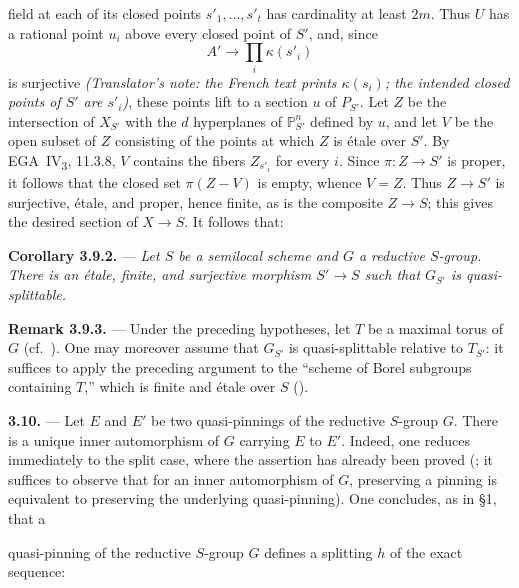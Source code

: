 {field at each of its closed points \(s'_1,\ldots,s'_t\) has
cardinality at least \(2m\).
Thus \(U\) has a rational point \(u_i\) above every closed point of
\(S'\), and, since
\[
  A'\longrightarrow\prod_i\kappa(s'_i)
\]
is surjective \emph{(Translator's note: the French text prints
\(\kappa(s_i)\); the intended closed points of \(S'\) are
\(s'_i\))}, these points lift to a section \(u\) of \(P_{S'}\).
Let \(Z\) be the intersection of \(X_{S'}\) with the \(d\)
hyperplanes of \(\mathbb P^n_{S'}\) defined by \(u\), and let \(V\)
be the open subset of \(Z\) consisting of the points at which \(Z\)
is étale over \(S'\). By EGA~IV\textsubscript{3}, 11.3.8, \(V\)
contains the fibers \(Z_{s'_i}\) for every \(i\). Since
\(\pi:Z\to S'\) is proper, it follows that the closed set
\(\pi(Z-V)\) is empty, whence \(V=Z\). Thus \(Z\to S'\) is
surjective, étale, and proper, hence finite, as is the composite
\(Z\to S\); this gives the desired section of \(X\to S\).}
It follows that:

\medskip\noindent\textbf{Corollary 3.9.2.} ---
{\itshape Let \(S\) be a semilocal scheme and \(G\) a reductive
\(S\)-group. There is an étale, finite, and surjective morphism
\(S'\to S\) such that \(G_{S'}\) is quasi-splittable.}

\medskip\noindent\textbf{Remark 3.9.3.} ---
Under the preceding hypotheses, let \(T\) be a maximal torus of
\(G\) (cf.\ ). One may moreover assume that \(G_{S'}\)
is quasi-splittable relative to \(T_{S'}\): it suffices to apply the
preceding argument to the ``scheme of Borel subgroups containing
\(T\),'' which is finite and étale over \(S\)
().

\medskip\noindent\textbf{3.10.} ---
Let \(E\) and \(E'\) be two quasi-pinnings of the reductive
\(S\)-group \(G\). There is a unique inner automorphism of \(G\)
carrying \(E\) to \(E'\). Indeed, one reduces immediately to the
split case, where the assertion has already been proved (; it
suffices to observe that for an inner automorphism of \(G\), preserving
a pinning is equivalent to preserving the underlying quasi-pinning).
One concludes, as in \S1, that a


quasi-pinning of the reductive \(S\)-group \(G\) defines a splitting
\(h\) of the exact sequence:


